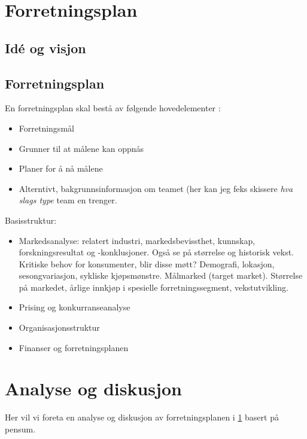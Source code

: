 \chapter{Forretningsplan}
\label{del1}

\section{Idé og visjon}


\section{Forretningsplan}

En forretningsplan skal bestå av følgende hovedelementer
\cite{wiki:business.plan}:

\begin{itemize}
    \item Forretningsmål
    \item Grunner til at målene kan oppnås
    \item Planer for å nå målene
    \item Alterntivt, bakgrunnsinformasjon om teamet (her kan jeg feks skissere
        \textit{hva slags type} team en trenger.
\end{itemize}

Basisstruktur:

\begin{itemize}
  \item Markedsanalyse: relatert industri, markedsbevissthet, kunnskap,
    forskningsresultat og -konklusjoner. Også se på størrelse og historisk
    vekst. Kritiske behov for konsumenter, blir disse møtt? Demografi,
    lokasjon, sesongvariasjon, sykliske kjøpsmønstre. Målmarked (target
    market). Størrelse på markedet, årlige innkjøp i spesielle
    forretningssegment, vekstutvikling.
  \item Prising og konkurranseanalyse
  \item Organisasjonsstruktur
  \item Finanser og forretningsplanen
\end{itemize}












\chapter{Analyse og diskusjon}

Her vil vi foreta en analyse og diskusjon av forretningsplanen i \ref{del1}
basert på pensum.

